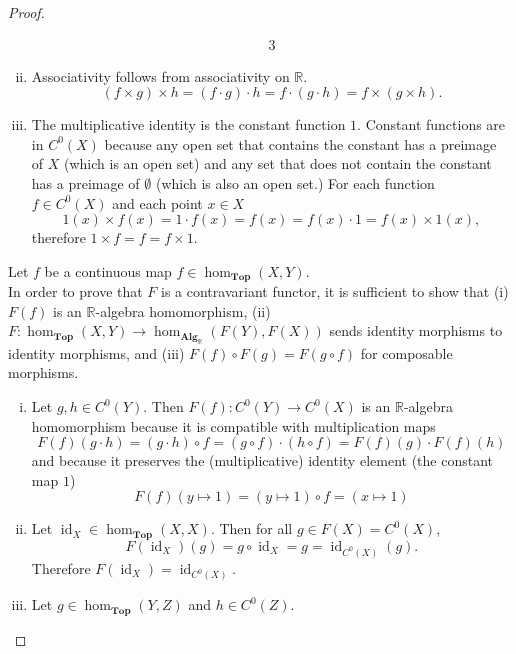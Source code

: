\documentclass{article}
\newenvironment{problempart}[1]{\begin{trivlist}\item[\textbf{Part #1.}]}{\end{trivlist}}
\begin{document}
\begin{proof}
\begin{problempart}{(b)}
\begin{enumerate}[(i)]
\begin{alignat*}{3}
    \end{alignat*}
    \item Associativity follows from associativity on $\mathbb{R}$. \[
      (f \times g) \times h = (f \cdot g) \cdot h = f \cdot (g \cdot h) = f \times (g \times h).
    \]
    \item The multiplicative identity is the constant function $1$. Constant
    functions are in $C^0(X)$ because any open set that contains the constant
    has a preimage of $X$ (which is an open set) and any set that does not
    contain the constant has a preimage of $\emptyset$ (which is also an open set.)
    For each function $f\in C^0(X)$ and each point $x \in X$ \[
      1(x) \times f(x) = 1 \cdot f(x) = f(x) = f(x) \cdot 1 = f(x) \times 1(x),
    \] therefore $1 \times f = f = f \times 1$.
  \end{enumerate}
\end{problempart}
\begin{problempart}{(c)}
  Let $f$ be a continuous map $f \in \operatorname{hom}_{\textbf{Top}}(X, Y)$.\\
  In order to prove that $F$ is a contravariant functor, it is sufficient to show that
    (i) $F(f)$ is an $\mathbb{R}$-algebra homomorphism,
    (ii) $F\colon\operatorname{hom}_{\textbf{Top}}(X,Y) \rightarrow \operatorname{hom}_{\textbf{Alg}_\mathbb{R}}(F(Y), F(X))$
      sends identity morphisms to identity morphisms, and
    (iii) $F(f) \circ F(g) = F(g\circ f)$ for composable morphisms.
\end{problempart}
\begin{enumerate}[(i)]
  \item{
    Let $g,h \in C^0(Y)$.
    Then $F(f)\colon C^0(Y) \rightarrow C^0(X)$ is an $\mathbb{R}$-algebra
    homomorphism because it is compatible with multiplication maps \[
      F(f)(g \cdot h) = (g \cdot h)\circ f
      = (g \circ f) \cdot (h\circ f)
      = F(f)(g) \cdot F(f)(h)
    \] and because it preserves the (multiplicative) identity element
    (the constant map $1$) \[
      F(f)(y\mapsto 1) = (y \mapsto 1) \circ f = (x \mapsto 1)
    \]
  }
  \item{
    Let $\operatorname{id}_X \in \operatorname{hom}_{\textbf{Top}}(X, X)$.
    Then for all $g \in F(X) = C^0(X)$, \[
      F(\operatorname{id}_X)(g) = g \circ \operatorname{id}_X
      = g
      = \operatorname{id}_{C^0(X)}(g).
    \] Therefore $F(\operatorname{id}_X) = \operatorname{id}_{C^0(X)}$.
  }
  \item{
    Let $g \in \operatorname{hom}_{\textbf{Top}}(Y, Z)$ and $h \in C^0(Z)$.
}
\end{enumerate}
\end{proof}
\end{document}
